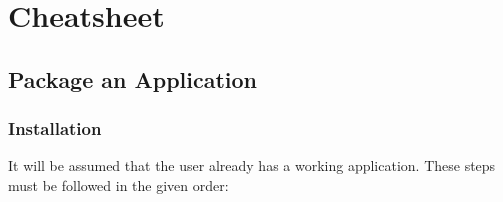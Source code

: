 \section{ Cheatsheet}



\subsection{Package an Application}


\subsubsection{Installation}

It will be assumed that the user already has a working
 application. These steps must be followed in the given order:

